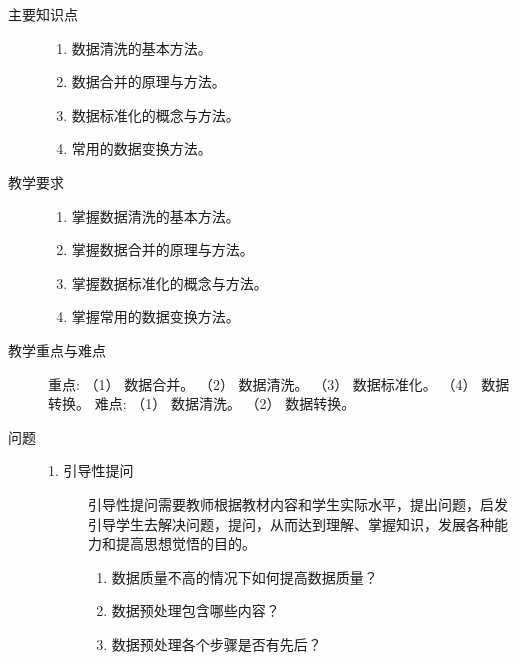 \documentclass[12pt,a4paper,openany,cap]{ctexbook}
\begin{document}
\begin{description}
\item[主要知识点]
  \begin{minipage}[t]{0.8\linewidth}
    \begin{enumerate}
    \item 数据清洗的基本方法。
\item\label{item:144}  数据合并的原理与方法。
\item\label{item:145}  数据标准化的概念与方法。
\item\label{item:146}  常用的数据变换方法。
    \end{enumerate}
  \end{minipage}

\item[教学要求]
  \begin{minipage}[t]{0.8\linewidth}
    \begin{enumerate}
    \item 掌握数据清洗的基本方法。
\item\label{item:147}  掌握数据合并的原理与方法。
\item\label{item:148}  掌握数据标准化的概念与方法。
\item\label{item:149}  掌握常用的数据变换方法。
    \end{enumerate}
  \end{minipage}

\item[教学重点与难点]    重点:
    （1） 数据合并。
    （2） 数据清洗。
    （3） 数据标准化。
    （4） 数据转换。
 难点:
    （1） 数据清洗。
    （2） 数据转换。
\item[问题]
  \begin{minipage}[t]{0.8\linewidth}
    \begin{description}
    \item[ 1. 引导性提问]          
引导性提问需要教师根据教材内容和学生实际水平，提出问题，启发引导学生去解决问题，提问，从而达到理解、掌握知识，发展各种能力和提高思想觉悟的目的。
\begin{enumerate}
\item     数据质量不高的情况下如何提高数据质量？
\item\label{item:150}  数据预处理包含哪些内容？
\item\label{item:151}  数据预处理各个步骤是否有先后？
\end{enumerate}
            

\end{description}
\end{minipage}
\end{description}
\end{document}
